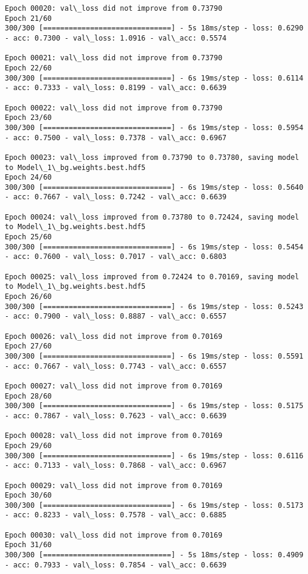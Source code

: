 \documentclass[11pt]{article}
\begin{document}
\begin{Verbatim}[commandchars=\\\{\}]
Epoch 00020: val\_loss did not improve from 0.73790
Epoch 21/60
300/300 [==============================] - 5s 18ms/step - loss: 0.6290 - acc: 0.7300 - val\_loss: 1.0916 - val\_acc: 0.5574

Epoch 00021: val\_loss did not improve from 0.73790
Epoch 22/60
300/300 [==============================] - 6s 19ms/step - loss: 0.6114 - acc: 0.7333 - val\_loss: 0.8199 - val\_acc: 0.6639

Epoch 00022: val\_loss did not improve from 0.73790
Epoch 23/60
300/300 [==============================] - 6s 19ms/step - loss: 0.5954 - acc: 0.7500 - val\_loss: 0.7378 - val\_acc: 0.6967

Epoch 00023: val\_loss improved from 0.73790 to 0.73780, saving model to Model\_1\_bg.weights.best.hdf5
Epoch 24/60
300/300 [==============================] - 6s 19ms/step - loss: 0.5640 - acc: 0.7667 - val\_loss: 0.7242 - val\_acc: 0.6639

Epoch 00024: val\_loss improved from 0.73780 to 0.72424, saving model to Model\_1\_bg.weights.best.hdf5
Epoch 25/60
300/300 [==============================] - 6s 19ms/step - loss: 0.5454 - acc: 0.7600 - val\_loss: 0.7017 - val\_acc: 0.6803

Epoch 00025: val\_loss improved from 0.72424 to 0.70169, saving model to Model\_1\_bg.weights.best.hdf5
Epoch 26/60
300/300 [==============================] - 6s 19ms/step - loss: 0.5243 - acc: 0.7900 - val\_loss: 0.8887 - val\_acc: 0.6557

Epoch 00026: val\_loss did not improve from 0.70169
Epoch 27/60
300/300 [==============================] - 6s 19ms/step - loss: 0.5591 - acc: 0.7667 - val\_loss: 0.7743 - val\_acc: 0.6557

Epoch 00027: val\_loss did not improve from 0.70169
Epoch 28/60
300/300 [==============================] - 6s 19ms/step - loss: 0.5175 - acc: 0.7867 - val\_loss: 0.7623 - val\_acc: 0.6639

Epoch 00028: val\_loss did not improve from 0.70169
Epoch 29/60
300/300 [==============================] - 6s 19ms/step - loss: 0.6116 - acc: 0.7133 - val\_loss: 0.7868 - val\_acc: 0.6967

Epoch 00029: val\_loss did not improve from 0.70169
Epoch 30/60
300/300 [==============================] - 6s 19ms/step - loss: 0.5173 - acc: 0.8233 - val\_loss: 0.7578 - val\_acc: 0.6885

Epoch 00030: val\_loss did not improve from 0.70169
Epoch 31/60
300/300 [==============================] - 5s 18ms/step - loss: 0.4909 - acc: 0.7933 - val\_loss: 0.7854 - val\_acc: 0.6639


\end{Verbatim}
\end{document}
